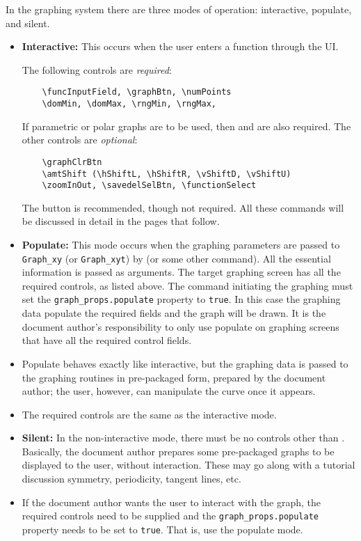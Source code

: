 \documentclass{article}
\begin{document}
In the {\AcroFLeX} graphing system there are three modes of
operation: interactive, populate, and silent.
\begin{itemize}
\item \textbf{Interactive:} This occurs when the user enters a
function through the UI.

The following controls are \emph{required}:
\begin{verbatim}
    \funcInputField, \graphBtn, \numPoints
    \domMin, \domMax, \rngMin, \rngMax,
\end{verbatim}
If parametric or polar graphs are to be used,
then  and  are also required. The other
controls are \emph{optional}:
\begin{verbatim}
    \graphClrBtn
    \amtShift (\hShiftL, \hShiftR, \vShiftD, \vShiftU)
    \zoomInOut, \savedelSelBtn, \functionSelect
\end{verbatim}
The  button is recommended, though not required.
All these commands will be discussed in detail in the pages that follow.

\item \textbf{Populate:} This mode occurs when the graphing parameters
are passed to \texttt{Graph\_xy} (or \texttt{Graph\_xyt}) by
 (or some other command). All the essential
information is passed as arguments. The target graphing screen
has all the required controls, as listed above. The command
initiating the graphing must set the
\texttt{graph\_props.populate} property to \texttt{true}. In
this case the graphing data populate the required fields and the
graph will be drawn. It is the document author's responsibility
to only use populate on graphing screens that have all the
required control fields.

\item[] Populate behaves exactly like interactive, but the graphing
data is passed to the graphing routines in pre-packaged form,
prepared by the document author; the user, however, can
manipulate the curve once it appears.

\item[] The required controls are the same as the interactive mode.

\item \textbf{Silent:} In the non-interactive mode, there must be no
controls other than .  Basically, the document
author prepares some pre-packaged graphs to be displayed to the
user, without interaction. These may go along with a tutorial
discussion symmetry, periodicity, tangent lines, etc.

\item[] If the document author wants the user to interact with the
graph, the required controls need to be supplied and the
\texttt{graph\_props.populate} property needs to be set to
\texttt{true}. That is, use the populate mode.

\end{itemize}
\end{document}

